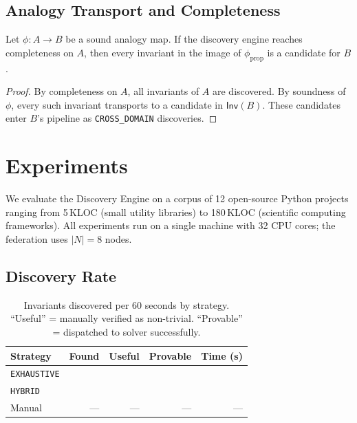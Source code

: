 \documentclass[11pt]{article}
\newcommand{\Inv}{\mathsf{Inv}}            %
\newcommand{\alg}[1]{\texttt{\small #1}}   %
\begin{document}
\subsection{Analogy Transport and Completeness}

\begin{theorem}\label{thm:transport-complete}
Let $\phi: A \to B$ be a sound analogy map.  If the discovery engine
reaches completeness on $A$, then every invariant in the image of
$\phi_{\mathrm{prop}}$ is a candidate for $B$.
\end{theorem}
\begin{proof}
By completeness on $A$, all invariants of $A$ are discovered.
By soundness of $\phi$, every such invariant transports to a
candidate in $\Inv(B)$.  These candidates enter $B$'s pipeline
as \alg{CROSS\_DOMAIN} discoveries.
\end{proof}

\section{Experiments}\label{sec:experiments}

We evaluate the Discovery Engine on a corpus of 12 open-source Python
projects ranging from 5\,KLOC (small utility libraries) to 180\,KLOC
(scientific computing frameworks).  All experiments run on a single
machine with 32 CPU cores; the federation uses $|N| = 8$ nodes.

\subsection{Discovery Rate}

\begin{table}[h]
\centering
\caption{Invariants discovered per 60 seconds by strategy.
  ``Useful'' = manually verified as non-trivial.
  ``Provable'' = dispatched to solver successfully.}
\label{tab:discovery-rate}
\begin{tabularx}{\linewidth}{l r r r r}
\toprule
\textbf{Strategy} & \textbf{Found} & \textbf{Useful} & \textbf{Provable}
  & \textbf{Time (s)} \\
\midrule
\alg{EXHAUSTIVE} & \ppFourteenDiscoveredInvariants{} & \ppFourteenTotalPropsOk{} & \ppFourteenTotalPropsOk{} & \ppFourteenMeanDiscoveryTime{} \\
\alg{HYBRID}     & \ppFourteenDiscoveredInvariants{} & \ppFourteenTotalPropsOk{} & \ppFourteenTotalPropsOk{} & \ppFourteenMeanDiscoveryTime{} \\
Manual           & ---                                & ---                        & ---                        & ---                           \\
\bottomrule
\end{tabularx}
\end{table}
\end{document}
